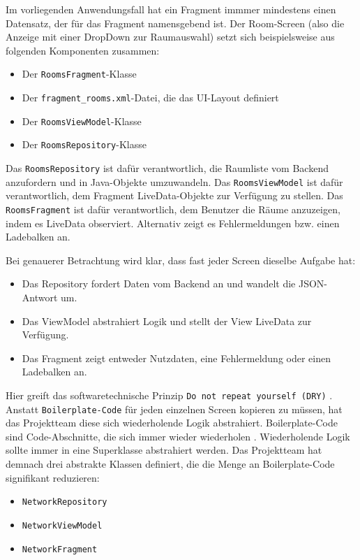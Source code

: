 Im vorliegenden Anwendungsfall hat ein Fragment immmer mindestens einen
Datensatz, der für das Fragment namensgebend ist. Der Room-Screen (also
die Anzeige mit einer DropDown zur Raumauswahl) setzt sich
beispielsweise aus folgenden Komponenten zusammen:

\begin{itemize}
\tightlist
\item
  Der \texttt{RoomsFragment}-Klasse
\item
  Der \texttt{fragment\_rooms.xml}-Datei, die das UI-Layout definiert
\item
  Der \texttt{RoomsViewModel}-Klasse
\item
  Der \texttt{RoomsRepository}-Klasse
\end{itemize}

Das \texttt{RoomsRepository} ist dafür verantwortlich, die Raumliste vom
Backend anzufordern und in Java-Objekte umzuwandeln. Das
\texttt{RoomsViewModel} ist dafür verantwortlich, dem Fragment
LiveData-Objekte zur Verfügung zu stellen. Das \texttt{RoomsFragment}
ist dafür verantwortlich, dem Benutzer die Räume anzuzeigen, indem es
LiveData observiert. Alternativ zeigt es Fehlermeldungen bzw. einen
Ladebalken an.

Bei genauerer Betrachtung wird klar, dass fast jeder Screen dieselbe
Aufgabe hat:

\begin{itemize}
\tightlist
\item
  Das Repository fordert Daten vom Backend an und wandelt die
  JSON-Antwort um.
\item
  Das ViewModel abstrahiert Logik und stellt der View LiveData zur
  Verfügung.
\item
  Das Fragment zeigt entweder Nutzdaten, eine Fehlermeldung oder einen
  Ladebalken an.
\end{itemize}

Hier greift das softwaretechnische Prinzip
\texttt{Do\ not\ repeat\ yourself\ (DRY)} \cite{dry}. Anstatt
\texttt{Boilerplate-Code} für jeden einzelnen Screen kopieren zu müssen,
hat das Projektteam diese sich wiederholende Logik abstrahiert.
Boilerplate-Code sind Code-Abschnitte, die sich immer wieder wiederholen
\cite{boiler}. Wiederholende Logik sollte immer in eine Superklasse
abstrahiert werden. Das Projektteam hat demnach drei abstrakte Klassen
definiert, die die Menge an Boilerplate-Code signifikant reduzieren:

\begin{itemize}
\tightlist
\item
  \texttt{NetworkRepository}
\item
  \texttt{NetworkViewModel}
\item
  \texttt{NetworkFragment}
\end{itemize}

